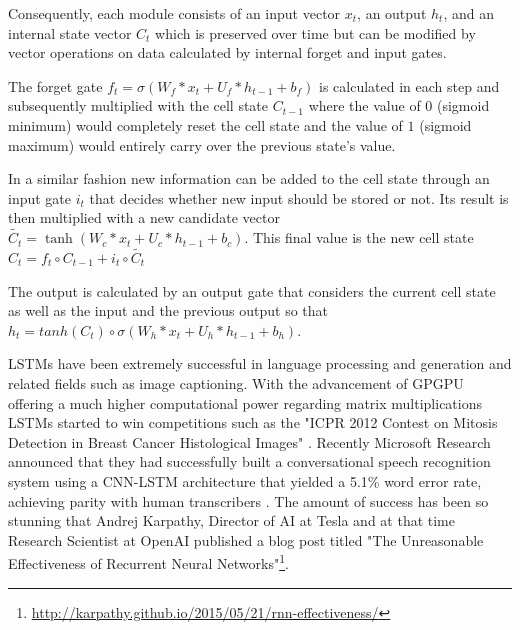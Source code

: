  
 Consequently, each module consists of an input vector $x_t$, an output  $h_t$, and an internal state vector $C_t$ which is preserved over time but can be modified by vector operations on data calculated by internal forget and input gates.
 
 The forget gate $f_t = \sigma (W_{f} * x_t + U_{f} * h_{t-1} + b_f)$ is calculated in each step and subsequently multiplied with the cell state $C_{t-1}$ where the value of $0$ (sigmoid minimum) would completely reset the cell state and the value of $1$ (sigmoid maximum) would entirely carry over the previous state's value.

In a similar fashion new information can be added to the cell state through an input gate $i_t$ that decides whether new input should be stored or not. Its result is then multiplied with a new candidate vector $\tilde{C_t} = \tanh(W_{c} * x_t + U_{c} * h_{t-1} + b_c)$. This final value is the new cell state $C_t = f_t \circ C_{t-1} + i_t \circ \tilde{C_t}$

The output is calculated by an output gate that considers the current cell state as well as the input and the previous output so that $h_t = tanh(C_t) \circ \sigma (W_{h} * x_t + U_{h} * h_{t-1} + b_h)$.



LSTMs have been extremely successful in language processing and generation and related fields such as image captioning. With the advancement of GPGPU offering a much higher computational power regarding matrix multiplications LSTMs started to win competitions such as the "ICPR 2012 Contest on Mitosis Detection in Breast Cancer Histological Images" \cite{10.1007/978-3-642-40763-5.51}. Recently Microsoft Research announced that they had successfully built a conversational speech recognition system using a CNN-LSTM architecture that yielded a 5.1\% word error rate, achieving parity with human transcribers \cite{DBLP:journals/corr/abs-1708-06073}. The amount of success has been so stunning that Andrej Karpathy, Director of AI at Tesla and at that time Research Scientist at OpenAI published a blog post titled "The Unreasonable Effectiveness of Recurrent Neural Networks"\footnote{\url{http://karpathy.github.io/2015/05/21/rnn-effectiveness/}}.

